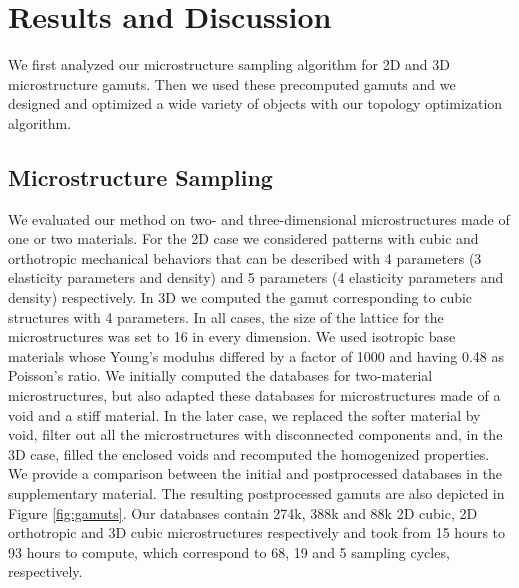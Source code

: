 \section{Results and Discussion}
We first analyzed our microstructure sampling algorithm for 2D and 3D microstructure gamuts. Then we used these precomputed gamuts and we designed and optimized a wide variety of objects with our topology optimization algorithm.
\subsection{Microstructure Sampling}
We evaluated our method on two- and three-dimensional microstructures made of one or two materials. For the 2D case we considered patterns with cubic and orthotropic mechanical behaviors that can be described with 4 parameters (3 elasticity parameters and density) and 5 parameters (4 elasticity parameters and density) respectively. In 3D we computed the gamut corresponding to cubic structures with 4 parameters. In all cases, the size of the lattice for the microstructures was set to 16 in every dimension. We used isotropic base materials whose Young's modulus differed by a factor of 1000 and having 0.48 as Poisson's ratio. We initially computed the databases for two-material microstructures, but also adapted these databases for microstructures made of a void and a stiff material. In the later case, we replaced the softer material by void, filter out all the microstructures with disconnected components and, in the 3D case, filled the enclosed voids and recomputed the homogenized properties. We provide a comparison between the initial and postprocessed databases in the supplementary material. The resulting postprocessed gamuts are also depicted in Figure \ref{fig:gamuts}. 
Our databases contain 274k, 388k and 88k 2D cubic, 2D orthotropic and 3D cubic microstructures respectively and took from 15 hours to 93 hours to compute, which correspond to 68, 19 and 5 sampling cycles, respectively.
